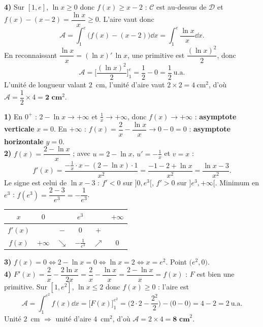 \textbf{4)} Sur $[1,e]$, $\ln x\ge0$ donc $f(x)\ge x-2$ : $\mathcal C$ est au-dessus de
$\mathcal D$ et $f(x)-(x-2)=\dfrac{\ln x}{x}\ge0$. L'aire vaut donc
\[
\mathcal A=\int_{1}^{e}\big(f(x)-(x-2)\big)\dd x=\int_{1}^{e}\frac{\ln x}{x}\dd x.
\]
En reconnaissant $\dfrac{\ln x}{x}=(\ln x)'\,\ln x$, une primitive est $\dfrac{(\ln x)^{2}}2$,
donc
\[
\mathcal A=\Big[\frac{(\ln x)^{2}}2\Big]_{1}^{e}=\frac{1}{2}-0=\frac12\ \text{u.a.}
\]
L'unité de longueur valant $2$~cm, l'unité d'aire vaut $2\times2=4\ \text{cm}^2$, d'où
$\mathcal A=\dfrac12\times4=\textbf{2~cm}^2$.

\textbf{1)} En $0^{+}$ : $2-\ln x\to+\infty$ et $\frac1x\to+\infty$, donc
$f(x)\to+\infty$ : \textbf{asymptote verticale} $x=0$. En $+\infty$ :
$f(x)=\dfrac{2}{x}-\dfrac{\ln x}{x}\to0-0=0$ : \textbf{asymptote horizontale} $y=0$.\\
\textbf{2)} $f(x)=\dfrac{2-\ln x}{x}$ ; avec $u=2-\ln x$, $u'=-\frac1x$ et $v=x$ :
\[
f'(x)=\frac{-\frac1x\cdot x-(2-\ln x)\cdot1}{x^{2}}=\frac{-1-2+\ln x}{x^{2}}
=\frac{\ln x-3}{x^{2}}.
\]
Le signe est celui de $\ln x-3$ : $f'<0$ sur $]0,e^{3}[$, $f'>0$ sur $]e^{3},+\infty[$.
Minimum en $e^{3}$ : $f(e^{3})=\dfrac{2-3}{e^{3}}=-\dfrac1{e^{3}}$.
\begin{center}\small
\begin{tabular}{c|ccccc}
$x$ & $0$ & & $e^{3}$ & & $+\infty$\\
\hline
$f'(x)$ & & $-$ & $0$ & $+$ & \\
\hline
$f(x)$ & $+\infty$ & $\searrow$ & $-\tfrac1{e^{3}}$ & $\nearrow$ & $0$\\
\end{tabular}
\end{center}
\textbf{3)} $f(x)=0\iff 2-\ln x=0\iff \ln x=2\iff x=e^{2}$. Point $\big(e^{2},0\big)$.\\
\textbf{4)} $F'(x)=\dfrac2x-\dfrac{2\ln x}{2x}=\dfrac2x-\dfrac{\ln x}{x}=\dfrac{2-\ln x}{x}
=f(x)$ : $F$ est bien une primitive. Sur $[1,e^{2}]$, $\ln x\le2$ donc $f(x)\ge0$ : l'aire est
\[
\mathcal A=\int_{1}^{e^{2}}f(x)\dd x=\big[F(x)\big]_{1}^{e^{2}}
=\Big(2\cdot2-\frac{2^{2}}2\Big)-\big(0-0\big)=4-2=2\ \text{u.a.}
\]
Unité $2$~cm $\Rightarrow$ unité d'aire $4$~cm$^2$, d'où $\mathcal A=2\times4=\textbf{8~cm}^2$.

